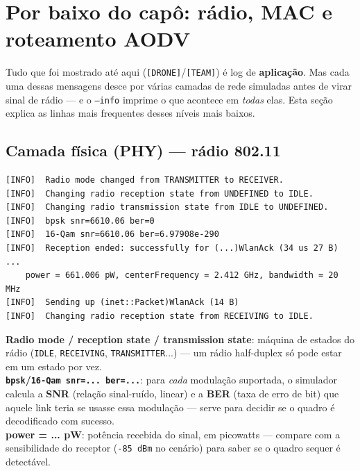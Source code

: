 \documentclass[11pt,a4paper]{article}
\begin{document}
\newpage
\section{Por baixo do capô: rádio, MAC e roteamento AODV}

Tudo que foi mostrado até aqui (\texttt{[DRONE]}/\texttt{[TEAM]}) é log de
\textbf{aplicação}. Mas cada uma dessas mensagens desce por várias camadas de
rede simuladas antes de virar sinal de rádio --- e o \texttt{--info} imprime
o que acontece em \emph{todas} elas. Esta seção explica as linhas mais
frequentes desses níveis mais baixos.

\subsection{Camada física (PHY) --- rádio 802.11}

\begin{lstlisting}[style=simlog]
[INFO]	Radio mode changed from TRANSMITTER to RECEIVER.
[INFO]	Changing radio reception state from UNDEFINED to IDLE.
[INFO]	Changing radio transmission state from IDLE to UNDEFINED.
[INFO]	bpsk snr=6610.06 ber=0
[INFO]	16-Qam snr=6610.06 ber=6.97908e-290
[INFO]	Reception ended: successfully for (...)WlanAck (34 us 27 B) ...
	power = 661.006 pW, centerFrequency = 2.412 GHz, bandwidth = 20 MHz
[INFO]	Sending up (inet::Packet)WlanAck (14 B)
[INFO]	Changing radio reception state from RECEIVING to IDLE.
\end{lstlisting}

\begin{explica}
\textbf{Radio mode / reception state / transmission state}: máquina de
estados do rádio (\texttt{IDLE}, \texttt{RECEIVING}, \texttt{TRANSMITTER}...)
--- um rádio half-duplex só pode estar em um estado por vez. \\
\textbf{\texttt{bpsk}/\texttt{16-Qam snr=... ber=...}}: para \emph{cada}
modulação suportada, o simulador calcula a \textbf{SNR} (relação sinal-ruído,
linear) e a \textbf{BER} (taxa de erro de bit) que aquele link teria se
usasse essa modulação --- serve para decidir se o quadro é decodificado com
sucesso. \\
\textbf{power = ... pW}: potência recebida do sinal, em picowatts --- compare
com a sensibilidade do receptor (\texttt{-85 dBm} no cenário) para saber se o
quadro sequer é detectável.
\end{explica}
\end{document}

